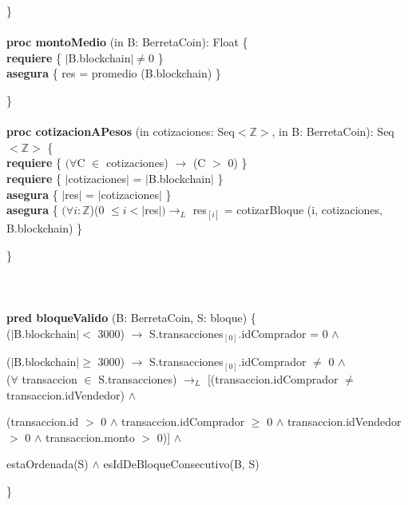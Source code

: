\documentclass{article}
\newcommand{\Entero}{$\mathds{Z}$}
\begin{document}
    \}\\\\

    \textbf{proc montoMedio} (in B: BerretaCoin): Float \{\\
        \indent\indent \textbf{requiere} \{ $|$B.blockchain$| \ne 0$ \}\\
        \indent\indent \textbf{asegura} \{ res = promedio (B.blockchain) \}

    \}\\\\

    \textbf{proc cotizacionAPesos} (in cotizaciones: Seq$<$\Entero$>$, in B: BerretaCoin): Seq$<$\Entero$>$ \{\\
        \indent\indent \textbf{requiere} \{ $(\forall$C $\in$ cotizaciones) $\rightarrow$ (C $>$ 0) \}\\
        \indent\indent \textbf{requiere} \{ $|$cotizaciones$|$ = $|$B.blockchain$|$ \}\\
        \indent\indent \textbf{asegura} \{ $|$res$|$ = $|$cotizaciones$|$ \}\\
        \indent\indent \textbf{asegura} \{ $(\forall i: $\Entero)(0 $\le i < |$res$|)\rightarrow_{L}$ res$_{[i]}$ = cotizarBloque (i, cotizaciones, B.blockchain) \}

    \}\\\\\\\\



    \indent\indent\textbf{pred bloqueValido} (B: BerretaCoin, S: bloque) \{\\
        \indent\indent\indent ($|$B.blockchain$|<$ 3000) $\rightarrow$ S.transacciones$_{[0]}$.idComprador = 0 $\land$

        \indent\indent\indent ($|$B.blockchain$|\ge$ 3000) $\rightarrow$ S.transacciones$_{[0]}$.idComprador $\ne$ 0 $\land$\\
        \indent\indent\indent($\forall$ transaccion $\in$ S.transacciones) $\rightarrow_{L}$ [(transaccion.idComprador $\ne$ transaccion.idVendedor) $\land$

        \indent\indent\indent(transaccion.id $>$ 0 $\land$ transaccion.idComprador $\ge$ 0 $\land$ transaccion.idVendedor $>$ 0 $\land$ transaccion.monto $>$ 0)] $\land$

        \indent\indent\indent estaOrdenada(S) $\land$ esIdDeBloqueConsecutivo(B, S)

    \indent\indent\}\\\\
\end{document}
